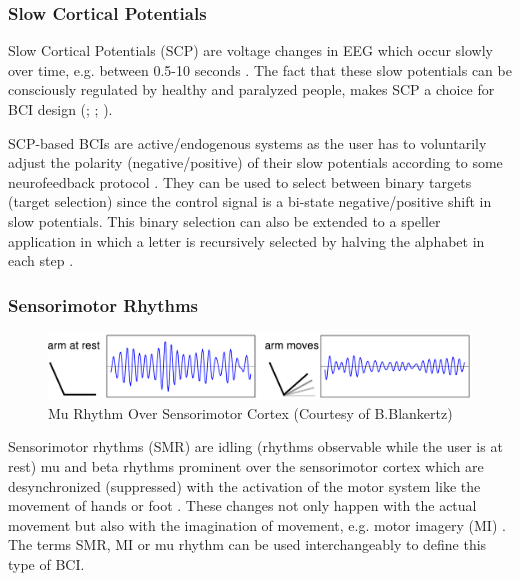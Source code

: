 \documentclass[12pt]{article}
\newcommand\mysubsubsection[1]{\subsubsection{#1}}
\numberwithin{equation}{section}
\numberwithin{figure}{section}
\numberwithin{table}{section}
\begin{document}
\mysubsubsection{Slow Cortical Potentials}
\par{
    Slow Cortical Potentials (SCP) are voltage changes in EEG which occur
    slowly over time, e.g. between 0.5-10 seconds \citep{wolpaw_brain_2010}.
    The fact that these slow potentials can be consciously regulated
    by healthy and paralyzed people, makes SCP a choice for BCI design
    (\citealp{birbaumer_thought_2000}; \citealp{hinterberger_brain-computer_2004}; \citealp{birbaumer_breaking_2006}).
}
\par{
    SCP-based BCIs are active/endogenous systems as the user has to voluntarily adjust
    the polarity (negative/positive) of their slow potentials according to some neurofeedback protocol \citep{jackson_neural_2010}.
    They can be used to select between binary targets (target selection) since the control signal is a bi-state
    negative/positive shift in slow potentials. This binary selection can also be extended
    to a speller application in which a letter is recursively selected by halving
    the alphabet in each step \citep{birbaumer_thought_2000}.
}

\mysubsubsection{Sensorimotor Rhythms}
\par{
    \begin{figure}[ht]
        \centering
        \includegraphics[scale=0.7]{images/motor_imagery}
        \caption[Mu Rhythm Over Sensorimotor Cortex]{Mu Rhythm Over Sensorimotor Cortex (Courtesy of B.Blankertz)}
        \label{fig:eeg_motor_imagery}
    \end{figure}

    Sensorimotor rhythms (SMR) are idling (rhythms observable while the
    user is at rest) mu and beta rhythms prominent over the sensorimotor cortex which are desynchronized
    (suppressed) with the activation of the motor system like the movement
    of hands or foot \citep{sellers_bcis_2010}. These changes not only happen
    with the actual movement but also with the imagination of movement, e.g. motor imagery (MI) \citep{mcfarland_braincomputer_2006}.
    The terms SMR, MI or mu rhythm can be used interchangeably to define this
    type of BCI.
}
\newpage
\end{document}
